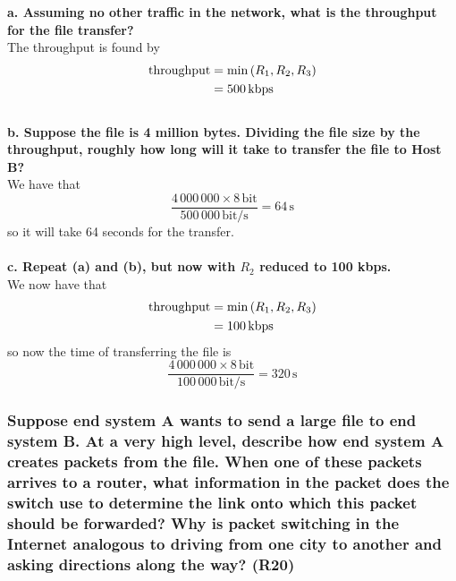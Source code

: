 \textbf{a. Assuming no other traffic in the network, what is the throughput for the file transfer?} \\
The throughput is found by
\begin{equation*}
\begin{split}
    \text{throughput} &= \min \left (R_1, R_2, R_3\right) \\
    &= 500 \, \text{kbps}
\end{split}
\end{equation*}
\\
\noindent
\textbf{b. Suppose the file is 4 million bytes. Dividing the file size by the throughput, roughly how long will it take to transfer the file to Host B?} \\
We have that 
\begin{equation*}
    \frac{4 \, 000 \, 000 \times 8 \, \text{bit}}{500 \, 000 \, \text{bit/s}} = 64 \, \text{s}
\end{equation*}
so it will take 64 seconds for the transfer. \\
\\
\textbf{c. Repeat (a) and (b), but now with $R_2$ reduced to 100 kbps.} \\
We now have that 
\begin{equation*}
    \begin{split}
        \text{throughput} &= \min \left (R_1, R_2, R_3\right) \\
        &= 100 \, \text{kbps}
\end{split}
\end{equation*}
so now the time of transferring the file is
\begin{equation*}
    \frac{4 \, 000 \, 000 \times 8 \, \text{bit}}{100 \, 000 \, \text{bit/s}} = 320 \, \text{s}
\end{equation*}



\subsubsection{Suppose end system A wants to send a large file to end system B. At a very high level, describe how end system A creates packets from the file. When one of these packets arrives to a router, what information in the packet does the switch use to determine the link onto which this packet should be forwarded? Why is packet switching in the Internet analogous to driving from one city to another and asking directions along the way? (R20)}

